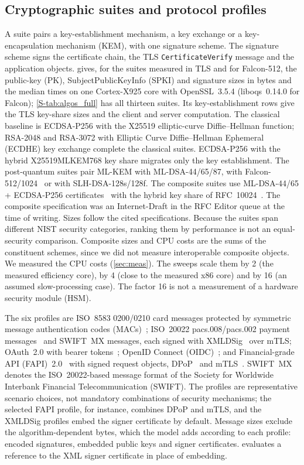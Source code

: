 \documentclass[preprint,12pt]{elsarticle}
\begin{document}
\subsection{Cryptographic suites and protocol profiles}
A suite pairs a key-establishment mechanism, a key exchange or a key-encapsulation mechanism (KEM), with one signature scheme. The signature scheme signs the certificate chain, the TLS \texttt{CertificateVerify} message and the application objects.  gives, for the suites measured in TLS and for Falcon-512, the public-key (PK), SubjectPublicKeyInfo (SPKI) and signature sizes in bytes and the median times on one Cortex-X925 core with OpenSSL~3.5.4 (liboqs~0.14.0 for Falcon); \cref{S-tab:algos_full} has all thirteen suites. Its key-establishment rows give the TLS key-share sizes and the client and server computation. The classical baseline is ECDSA-P256 with the X25519 elliptic-curve Diffie--Hellman function; RSA-2048 and RSA-3072 with Elliptic Curve Diffie--Hellman Ephemeral (ECDHE) key exchange complete the classical suites. ECDSA-P256 with the hybrid X25519MLKEM768 key share migrates only the key establishment. The post-quantum suites pair ML-KEM with ML-DSA-44/65/87, with Falcon-512/1024~\cite{falcon2020} or with SLH-DSA-128s/128f. The composite suites use ML-DSA-44/65 + ECDSA-P256 certificates~\cite{compositedraft} with the hybrid key share of RFC~10024~\cite{hybriddraft}. The composite specification was an Internet-Draft in the RFC Editor queue at the time of writing. Sizes follow the cited specifications. Because the suites span different NIST security categories, ranking them by performance is not an equal-security comparison. Composite sizes and CPU costs are the sums of the constituent schemes, since we did not measure interoperable composite objects. We measured the CPU costs (\cref{sec:meas}). The sweeps scale them by 2 (the measured efficiency core), by 4 (close to the measured x86 core) and by 16 (an assumed slow-processing case). The factor 16 is not a measurement of a hardware security module (HSM).

The six profiles are ISO~8583 0200/0210 card messages protected by symmetric message authentication codes (MACs)~\cite{iso8583}; ISO~20022 pacs.008/pacs.002 payment messages~\cite{iso20022} and SWIFT~MX messages, each signed with XMLDSig~\cite{xmldsig} over mTLS; OAuth~2.0 with bearer tokens~\cite{rfc6749,rfc6750}; OpenID Connect (OIDC)~\cite{oidccore}; and Financial-grade API (FAPI)~2.0~\cite{fapi2} with signed request objects, DPoP~\cite{rfc9449} and mTLS~\cite{rfc8705}. SWIFT~MX denotes the ISO~20022-based message format of the Society for Worldwide Interbank Financial Telecommunication (SWIFT). The profiles are representative scenario choices, not mandatory combinations of security mechanisms; the selected FAPI profile, for instance, combines DPoP and mTLS, and the XMLDSig profiles embed the signer certificate by default. Message sizes exclude the algorithm-dependent bytes, which the model adds according to each profile: encoded signatures, embedded public keys and signer certificates.  evaluates a reference to the XML signer certificate in place of embedding.
\end{document}
